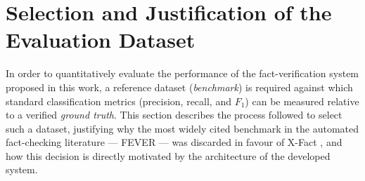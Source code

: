 

\section{Selection and Justification of the Evaluation Dataset}
\label{sec:dataset-selection}

In order to quantitatively evaluate the performance of the
fact-verification system proposed in this work, a reference dataset
(\textit{benchmark}) is required against which standard
classification metrics (precision, recall, and $F_1$) can be
measured relative to a verified \textit{ground truth}. This section
describes the process followed to select such a dataset, justifying
why the most widely cited benchmark in the automated fact-checking
literature --- FEVER \cite{thorne2018fever} --- was discarded in
favour of X-Fact \cite{gupta2021xfact}, and how this decision is
directly motivated by the architecture of the developed system.








